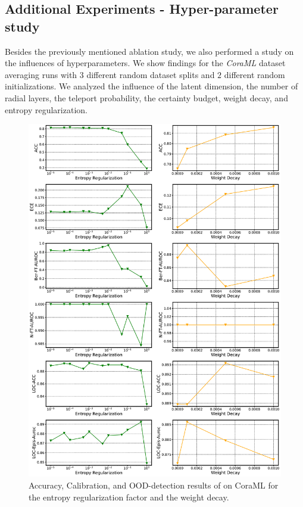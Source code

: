 \subsection{Additional Experiments - Hyper-parameter study} \label{sec:hyperparameter-study}
Besides the previously mentioned ablation study, we also performed a study on the influences of hyperparameters. We show findings for the \emph{CoraML} dataset averaging runs with $3$ different random dataset splits and $2$ different random initializations. We analyzed the influence of the latent dimension, the number of radial layers, the teleport probability, the certainty budget, weight decay, and entropy regularization. 
%

%
\begin{figure}[h]
    \centering
    \includegraphics[width=\textwidth]{sections/009_neurips2021/resources/grid_search.pdf}
    \caption{Accuracy, Calibration, and OOD-detection results of \GPNacro{} on CoraML for the entropy regularization factor and the weight decay.}
    \label{fig:gs-regularization}
\end{figure}
%

